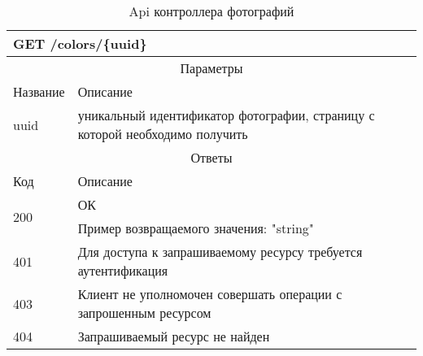 \begin{table}[H]
  \caption{Api контроллера фотографий}\label{api-photos-table}
  \begin{tabular}{|p{6cm}|p{10cm}|}
  \hline \multicolumn{2}{|l|}{GET /colors/\{uuid\}} \\
  \hline \multicolumn{2}{|c|}{Параметры} \\
  \hline Название & Описание \\
  \hline uuid & уникальный идентификатор фотографии, страницу с которой необходимо получить \\
  \hline \multicolumn{2}{|c|}{Ответы} \\
  \hline Код & Описание \\
  \hline \multirow{2}{=}{200} & ОК \\
   & Пример возвращаемого значения: "string" \\
  \hline 401 & Для доступа к запрашиваемому ресурсу требуется аутентификация \\
  \hline 403 & Клиент не уполномочен совершать операции с запрошенным ресурсом \\
  \hline 404 & Запрашиваемый ресурс не найден \\
  \hline
  \end{tabular}
\end{table}

